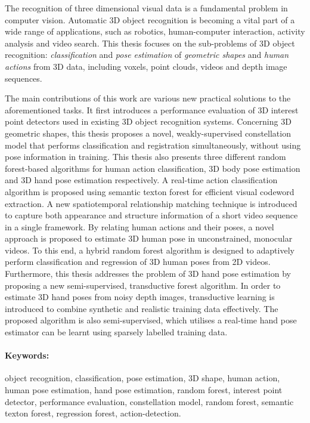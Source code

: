 
The recognition of three dimensional visual data is a fundamental problem in computer vision.  Automatic 3D object recognition is becoming a vital part of a wide range of applications, such as robotics, human-computer interaction, activity analysis and video search. This thesis focuses on the sub-problems of 3D object recognition: \emph{classification} and \emph{pose estimation} of \emph{geometric shapes} and \emph{human actions} from 3D data, including voxels, point clouds, videos and depth image sequences.  

The main contributions of this work are various new practical solutions to the aforementioned tasks. 
It first introduces a performance evaluation of 3D interest point detectors used in existing 3D object recognition systems. 
Concerning 3D geometric shapes, this thesis proposes a novel, weakly-supervised constellation model that performs classification and registration simultaneously, without using pose information in training. 
This thesis also presents three different random forest-based algorithms for human action classification, 3D body pose estimation and 3D hand pose estimation respectively. 
A real-time action classification algorithm is proposed using semantic texton forest for efficient visual codeword extraction. A new spatiotemporal relationship matching technique is introduced to capture both appearance and structure information of a short video sequence in a single framework.  
By relating human actions and their poses, a novel approach is proposed to estimate 3D human pose in unconstrained, monocular videos. To this end, a hybrid random forest algorithm is designed to adaptively perform classification and regression of 3D human poses from 2D videos. 
Furthermore, this thesis addresses the problem of 3D hand pose estimation by proposing a new semi-supervised, transductive forest algorithm. In order to estimate 3D hand poses from noisy depth images, transductive learning is introduced to combine synthetic and realistic training data effectively. The proposed algorithm is also semi-supervised, which utilises a real-time hand pose estimator can be learnt using sparsely labelled training data.  
 
\paragraph{Keywords:~} object recognition, classification, pose estimation, 3D shape, human action, human pose estimation, hand pose estimation, random forest, interest point detector, performance evaluation, constellation model, random forest, semantic texton forest, regression forest, action-detection. 
